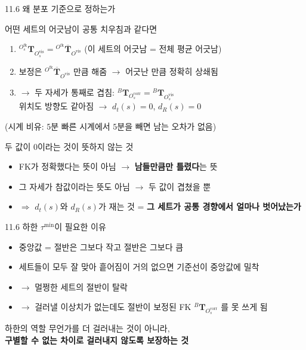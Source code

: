 \documentclass[aspectratio=169,11pt]{beamer}
\newcommand{\T}[3][]{{}^{#2}\mathbf{T}^{#1}_{#3}}   %
\newcommand{\Tb}[2]{{}^{#1}\overline{\mathbf{T}}_{#2}} %
\newcommand{\Ofk}{O^{\mathrm{fk}}}     %
\newcommand{\Ovis}{O^{\mathrm{vis}}}   %
\newcommand{\Ocorr}{O^{\mathrm{corr}}} %
\begin{document}
\begin{frame}{11.6 왜 분포 기준으로 정하는가}
  \begin{block}{어떤 세트의 어긋남이 공통 치우침과 같다면}
    \begin{enumerate}
      \item $\T{\Ofk_s}{\Ovis_s} = \Tb{\Ofk}{\Ovis}$
        (이 세트의 어긋남 = 전체 평균 어긋남)
      \item 보정은 $\Tb{\Ofk}{\Ovis}$ 만큼 해줌
        $\rightarrow$ 어긋난 만큼 정확히 상쇄됨
      \item $\rightarrow$ 두 자세가 통째로 겹침:
        $\T{B}{\Ocorr_s}=\T{B}{\Ovis_s}$\\
        위치도 방향도 같아짐 $\rightarrow$ $d_t(s)=0$, $d_R(s)=0$
    \end{enumerate}
    \vspace{1mm}
    (시계 비유: $5$분 빠른 시계에서 $5$분을 빼면 남는 오차가 없음)
  \end{block}
  \vfill
  \begin{alertblock}{두 값이 $0$이라는 것이 뜻하지 않는 것}
    \begin{itemize}
      \item FK가 정확했다는 뜻이 아님 $\rightarrow$ \textbf{남들만큼만 틀렸다}는 뜻
      \item 그 자세가 참값이라는 뜻도 아님 $\rightarrow$ 두 값이 겹쳤을 뿐
      \item $\Rightarrow$ $d_t(s)$와 $d_R(s)$가 재는 것 =
        \textbf{그 세트가 공통 경향에서 얼마나 벗어났는가}
    \end{itemize}
  \end{alertblock}
\end{frame}

\begin{frame}{11.6 하한 $\tau^{\min}$이 필요한 이유}
  \begin{itemize}
    \item 중앙값 = 절반은 그보다 작고 절반은 그보다 큼
    \item 세트들이 모두 잘 맞아 흩어짐이 거의 없으면 기준선이 중앙값에 밀착
    \item $\rightarrow$ \alert{멀쩡한 세트의 절반이 탈락}
    \item $\rightarrow$ 걸러낼 이상치가 없는데도 절반이
      보정된 FK $\T{B}{\Ocorr_s}$ 를 못 쓰게 됨
  \end{itemize}
  \vfill
  \begin{alertblock}{하한의 역할}
    무언가를 더 걸러내는 것이 아니라,\\
    \textbf{구별할 수 없는 차이로 걸러내지 않도록 보장하는 것}
  \end{alertblock}
\end{frame}
\end{document}

